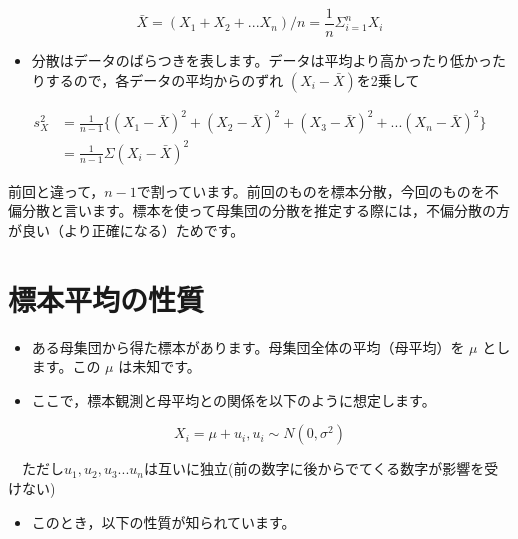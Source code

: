 \documentclass[
  letterpaper,
  DIV=11,
  numbers=noendperiod]{scrreprt}
\providecommand{\tightlist}{%
  \setlength{\itemsep}{0pt}\setlength{\parskip}{0pt}}\usepackage{longtable,booktabs,array}
\begin{document}
\[ \bar X = (X_1 + X_2 + ... X_n )/n = \frac{1}{n} \Sigma_{i=1}^{n} X_i
\]

\begin{itemize}
\tightlist
\item
  分散はデータのばらつきを表します。データは平均より高かったり低かったりするので，各データの平均からのずれ
  \((X_i - \bar X)\)を2乗して
\end{itemize}

\[
\begin{split}
s_X^2 &= \frac{1}{n-1}\{(X_1 - \bar X)^2+(X_2 - \bar X)^2+(X_3 - \bar X)^2+...(X_n - \bar X)^2 \} \\ &= \frac{1}{n-1}\Sigma (X_i - \bar X)^2
\end{split}
\]

\begin{tcolorbox}[enhanced jigsaw, colframe=quarto-callout-caution-color-frame, left=2mm, breakable, colback=white, opacityback=0, toprule=.15mm, rightrule=.15mm, leftrule=.75mm, arc=.35mm, bottomrule=.15mm]

前回と違って，\(n-1\)で割っています。前回のものを標本分散，今回のものを不偏分散と言います。標本を使って母集団の分散を推定する際には，不偏分散の方が良い（より正確になる）ためです。

\end{tcolorbox}

\hypertarget{ux6a19ux672cux5e73ux5747ux306eux6027ux8cea}{%
\chapter{標本平均の性質}\label{ux6a19ux672cux5e73ux5747ux306eux6027ux8cea}}

\begin{itemize}
\item
  ある母集団から得た標本があります。母集団全体の平均（母平均）を \(\mu\)
  とします。この \(\mu\) は未知です。
\item
  ここで，標本観測と母平均との関係を以下のように想定します。
\end{itemize}

\[
X_i = \mu+u_i, u_i  \sim N(0,\sigma ^2)
\]

　ただし\(u_1,u_2,u_3...u_n\)は互いに独立(前の数字に後からでてくる数字が影響を受けない)

\begin{itemize}
\tightlist
\item
  このとき，以下の性質が知られています。
\end{itemize}
\end{document}
